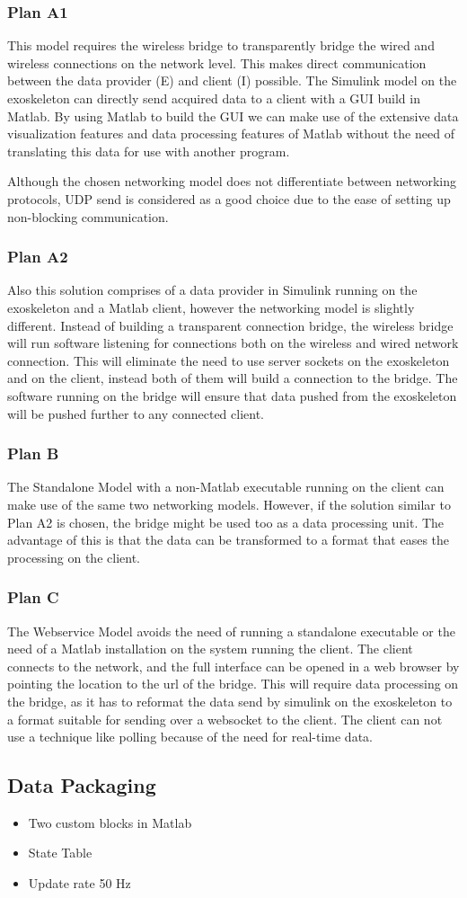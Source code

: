 \subsubsection{Plan A1}
This model requires the wireless bridge to transparently bridge the wired and wireless connections on the network level. This makes direct communication between the data provider (E) and client (I) possible. The Simulink model on the exoskeleton can directly send acquired data to a client with a GUI build in Matlab. By using Matlab to build the GUI we can make use of the extensive data visualization features and data processing features of Matlab without the need of translating this data for use with another program. 

Although the chosen networking model does not differentiate between networking protocols, UDP send \cite{web:UDPSend} is considered as a good choice due to the ease of setting up non-blocking communication.
\subsubsection{Plan A2}
Also this solution comprises of a data provider in Simulink running on the exoskeleton and a Matlab client, however the networking model is slightly different. Instead of building a transparent connection bridge, the wireless bridge will run software listening for connections both on the wireless and wired network connection. This will eliminate the need to use server sockets on the exoskeleton and on the client, instead both of them will build a connection to the bridge. The software running on the bridge will ensure that data pushed from the exoskeleton will be pushed further to any connected client.
\subsubsection{Plan B}
The Standalone Model with a non-Matlab executable running on the client can make use of the same two networking models. However, if the solution similar to Plan A2 is chosen, the bridge might be used too as a data processing unit. The advantage of this is that the data can be transformed to a format that eases the processing on the client.
\subsubsection{Plan C}
The Webservice Model avoids the need of running a standalone executable or the need of a Matlab installation on the system running the client. The client connects to the network, and the full interface can be opened in a web browser by pointing the location to the url of the bridge. This will require data processing on the bridge, as it has to reformat the data send by simulink on the exoskeleton to a format suitable for sending over a websocket to the client. The client can not use a technique like polling because of the need for real-time data.

\subsection{Data Packaging}
\begin{itemize}
	\item Two custom blocks in Matlab
	\item State Table
	\item Update rate 50 Hz
\end{itemize}